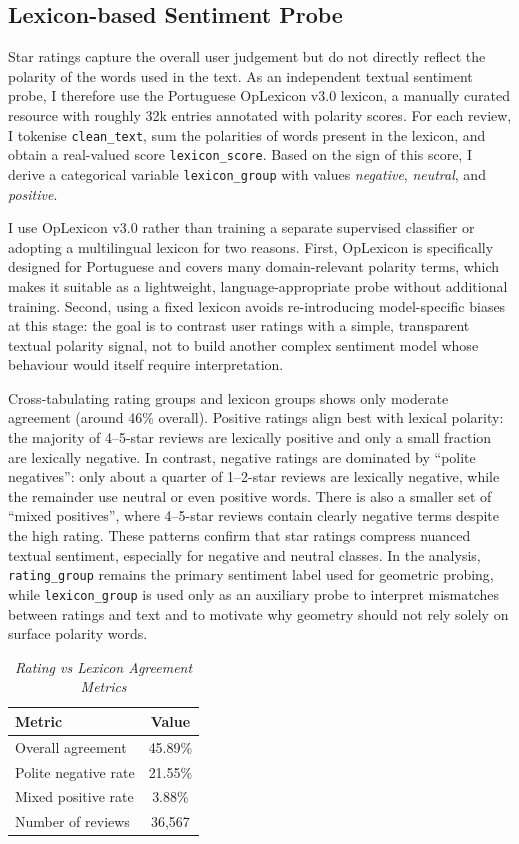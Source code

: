 \documentclass[a4paper,11pt]{article}
\begin{document}
\subsection{Lexicon-based Sentiment Probe}
Star ratings capture the overall user judgement but do not directly reflect the polarity of the words used in the text. 
As an independent textual sentiment probe, I therefore use the Portuguese OpLexicon v3.0 lexicon, a manually curated resource with roughly 32k entries annotated with polarity scores. 
For each review, I tokenise \texttt{clean\_text}, sum the polarities of words present in the lexicon, and obtain a real-valued score \texttt{lexicon\_score}. 
Based on the sign of this score, I derive a categorical variable \texttt{lexicon\_group} with values \emph{negative}, \emph{neutral}, and \emph{positive}.

I use OpLexicon v3.0 rather than training a separate supervised classifier or adopting a multilingual lexicon for two reasons. 
First, OpLexicon is specifically designed for Portuguese and covers many domain-relevant polarity terms, which makes it suitable as a lightweight, language-appropriate probe without additional training. 
Second, using a fixed lexicon avoids re-introducing model-specific biases at this stage: the goal is to contrast user ratings with a simple, transparent textual polarity signal, not to build another complex sentiment model whose behaviour would itself require interpretation.

Cross-tabulating rating groups and lexicon groups shows only moderate agreement (around 46\% overall). 
Positive ratings align best with lexical polarity: the majority of 4--5-star reviews are lexically positive and only a small fraction are lexically negative. 
In contrast, negative ratings are dominated by ``polite negatives'': only about a quarter of 1--2-star reviews are lexically negative, while the remainder use neutral or even positive words. 
There is also a smaller set of ``mixed positives'', where 4--5-star reviews contain clearly negative terms despite the high rating. 
These patterns confirm that star ratings compress nuanced textual sentiment, especially for negative and neutral classes. 
In the analysis, \texttt{rating\_group} remains the primary sentiment label used for geometric probing, while \texttt{lexicon\_group} is used only as an auxiliary probe to interpret mismatches between ratings and text and to motivate why geometry should not rely solely on surface polarity words.

\begin{table}[tbp]
\centering
\small
\caption{\textit{Rating vs Lexicon Agreement Metrics}}
\label{tab:data-lexicon-agreement}
\begin{tabular}{lc}
\toprule
\textbf{Metric} & \textbf{Value} \\
\midrule
Overall agreement & 45.89\% \\
Polite negative rate & 21.55\% \\
Mixed positive rate & 3.88\% \\
Number of reviews & 36{,}567 \\
\bottomrule
\end{tabular}
\end{table}
\end{document}
